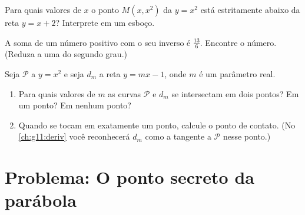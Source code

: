 \begin{exercise}[$\star\star$]\label{exo:g11:quad:9}
Para quais valores de $x$ o ponto $M(x, x^2)$ da  $y = x^2$ está
estritamente abaixo da reta $y = x + 2$? Interprete em um esboço.
\end{exercise}

\begin{exercise}[$\star\star$]\label{exo:g11:quad:10}
A soma de um número positivo com o seu inverso é $\frac{13}{6}$. Encontre
o número. (Reduza a uma  do segundo grau.)
\end{exercise}

\begin{exercise}[$\star\star\star$]\label{exo:g11:quad:11}
Seja $\mathcal P$ a  $y = x^2$ e seja $d_m$ a reta $y = mx - 1$,
onde $m$ é um parâmetro real.
\begin{enumerate}
  \item Para quais valores de $m$ as curvas $\mathcal P$ e $d_m$ se
        intersectam em dois pontos? Em um ponto? Em nenhum ponto?
  \item Quando se tocam em exatamente um ponto, calcule o ponto de
        contato. (No \cref{ch:g11:deriv} você reconhecerá $d_m$ como a
        tangente a $\mathcal P$ nesse ponto.)
\end{enumerate}
\end{exercise}

\section{Problema: O ponto secreto da parábola}

